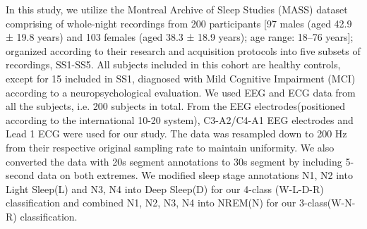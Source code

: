 \documentclass[letterpaper, 10 pt, conference]{ieeeconf}
\begin{document}
In this study, we utilize the Montreal Archive of Sleep Studies (MASS) \cite{o2014montreal} dataset comprising of whole‐night recordings from 200 participants [97 males (aged 42.9 ± 19.8 years) and 103 females (aged 38.3 ± 18.9 years); age range: 18–76 years]; organized according to their research and acquisition protocols into five subsets of recordings, SS1-SS5. All subjects included in this cohort are healthy controls, except for 15 included in SS1, diagnosed with Mild Cognitive Impairment (MCI) according to a neuropsychological evaluation. We used EEG and ECG data from all the subjects, i.e. 200 subjects in total. From the EEG electrodes(positioned according to the international 10-20 system), C3-A2/C4-A1 EEG electrodes and Lead 1 ECG were used for our study. The data was resampled down to 200 Hz from their respective original sampling rate to maintain uniformity. We also converted the data with 20s segment annotations to 30s segment by including 5-second data on both extremes. We modified sleep stage annotations N1, N2 into Light Sleep(L) and N3, N4 into Deep Sleep(D) for our 4-class (W-L-D-R) classification and combined N1, N2, N3, N4 into NREM(N) for our 3-class(W-N-R) classification.
 
\end{document}
